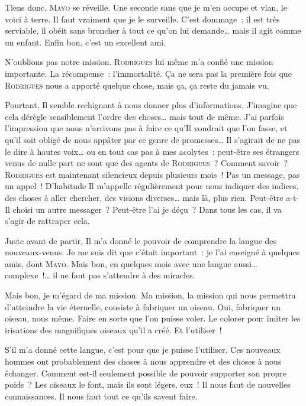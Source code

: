 {
	Tiens donc, \textsc{Mayo} se réveille.
	Une seconde sans que je m’en occupe et vlan, le voici à terre.
	Il faut vraiment que je le surveille.
	C’est dommage~:  il est très serviable, il obéit sans broncher à tout ce qu’on lui demande… mais il agit comme un enfant.
	Enfin bon, c’est un excellent ami.

	N’oublions pas notre mission.
	\textsc{Rodrigues} lui même m’a confié une mission importante.
	La récompense~:  l’immortalité.
	Ça ne sera pas la première fois que \textsc{Rodrigues} nous a apporté quelque chose, mais ça, ça reste du jamais vu.

	Pourtant, Il semble rechignant à nous donner plus d’informations.
	J’imagine que cela dérègle sensiblement l’ordre des choses… mais tout de même.
	J’ai parfois l’impression que nous n’arrivons pas à faire ce qu’Il voudrait que l’on fasse, et qu’il soit obligé de nous appâter par ce genre de promesses…
	Il s’agirait de ne pas le dire à hautes voix… ou en tout cas pas à mes acolytes~:  peut-être ses étrangers venus de nulle part ne sont que des agents de \textsc{Rodrigues}~?
	Comment savoir~?  \textsc{Rodrigues} est maintenant silencieux depuis plusieurs mois~!
	Pas un message, pas un appel~!
	D’habitude Il m’appelle régulièrement pour nous indiquer des indices, des choses à aller chercher, des visions diverses… mais là, plus rien.
	Peut-être a-t-Il choisi un autre messager~?
	Peut-être l’ai je déçu~?
	Dans tous les cas, il va s’agir de rattraper cela.

	Juste avant de partir, Il m’a donné le pouvoir de comprendre la langue des nouveaux-venus.
	Je me suis dit que c’était important~:  je l’ai enseigné à quelques amis, dont \textsc{Mayo}.
	Mais bon, en quelques mois avec une langue aussi… complexe~!… il ne faut pas s’attendre à des miracles.

	Mais bon, je m’égard de ma mission.
	Ma mission, la mission qui nous permettra d’atteindre la vie éternelle, consiste à fabriquer un oiseau.
	Oui, fabriquer un oiseau, nous même.
	Faire en sorte que l’on puisse voler.
	Le colorer pour imiter les irisations des magnifiques oiseaux qu’il a créé.
	Et l’utiliser~!

	S’il m’a donné cette langue, c’est pour que je puisse l’utiliser.
	Ces nouveaux hommes ont probablement des choses à nous apprendre et des choses à nous échanger.
	Comment est-il seulement possible de pouvoir supporter son propre poids~?  Les oiseaux le font, mais ils sont légers, eux~!
	Il nous faut de nouvelles connaissances.  Il nous faut tout ce qu’ils savent faire.

}
